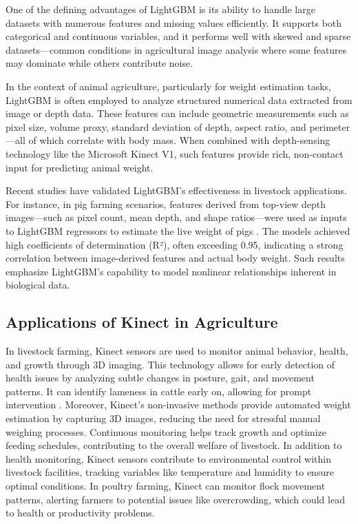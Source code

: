 {One of the defining advantages of LightGBM is its ability to handle large datasets with numerous features and missing values efficiently. It supports both categorical and continuous variables, and it performs well with skewed and sparse datasets—common conditions in agricultural image analysis where some features may dominate while others contribute noise.

In the context of animal agriculture, particularly for weight estimation tasks, LightGBM is often employed to analyze structured numerical data extracted from image or depth data. These features can include geometric measurements such as pixel size, volume proxy, standard deviation of depth, aspect ratio, and perimeter—all of which correlate with body mass. When combined with depth-sensing technology like the Microsoft Kinect V1, such features provide rich, non-contact input for predicting animal weight.

Recent studies have validated LightGBM’s effectiveness in livestock applications. For instance, in pig farming scenarios, features derived from top-view depth images—such as pixel count, mean depth, and shape ratios—were used as inputs to LightGBM regressors to estimate the live weight of pigs \citep{pezzuolo2018barn}. The models achieved high coefficients of determination (R²), often exceeding 0.95, indicating a strong correlation between image-derived features and actual body weight. Such results emphasize LightGBM's capability to model nonlinear relationships inherent in biological data.


\subsection{Applications of Kinect in Agriculture}

In livestock farming, Kinect sensors are used to monitor animal behavior, health, and growth through 3D imaging. This technology allows for early detection of health issues by analyzing subtle changes in posture, gait, and movement patterns. It can identify lameness in cattle early on, allowing for prompt intervention \citep{singh2022smart}. Moreover, Kinect’s non-invasive methods provide automated weight estimation by capturing 3D images, reducing the need for stressful manual weighing processes. Continuous monitoring helps track growth and optimize feeding schedules, contributing to the overall welfare of livestock. In addition to health monitoring, Kinect sensors contribute to environmental control within livestock facilities, tracking variables like temperature and humidity to ensure optimal conditions. In poultry farming, Kinect can monitor flock movement patterns, alerting farmers to potential issues like overcrowding, which could lead to health or productivity problems.

}
